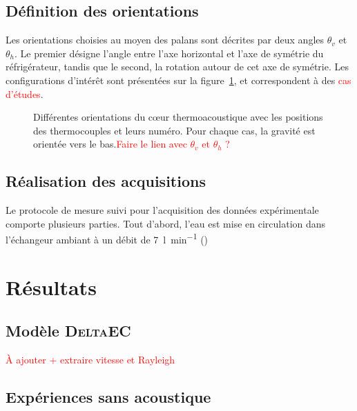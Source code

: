 \subsection{Définition des orientations}

Les orientations choisies au moyen des palans sont décrites par deux angles $\theta_v$ et $\theta_h$. Le premier désigne l'angle entre l'axe horizontal et l'axe de symétrie du réfrigérateur, tandis que le second, la rotation autour de cet axe de symétrie. Les configurations d'intérêt sont présentées sur la figure~\ref{fig:OrientationCore}, et correspondent à des \textcolor{red}{cas d'études}.

\begin{figure}[!ht]
    \centering
    
    \caption{Différentes orientations du c\oe{}ur thermoacoustique avec les positions des thermocouples et leurs numéro. Pour chaque cas, la gravité est orientée vers le bas.\textcolor{red}{Faire le lien avec $\theta_v$ et $\theta_h$ ?}}
    \label{fig:OrientationCore}
\end{figure}




\subsection{Réalisation des acquisitions}

Le protocole de mesure suivi pour l'acquisition des données expérimentale comporte plusieurs parties. Tout d'abord, l'eau est mise en circulation dans l'échangeur ambiant à un débit de \qty{7}{\l\per\minute} ()





\section{Résultats}

\subsection{Modèle \textsc{DeltaEC}}

\textcolor{red}{À ajouter + extraire vitesse et Rayleigh}

\subsection{Expériences sans acoustique}

